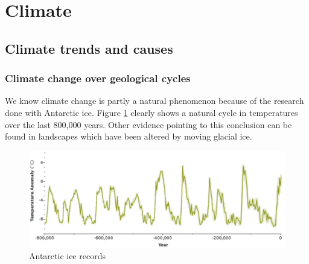 \documentclass[../summary.tex]{subfiles}
\begin{document}
	
	\section{Climate}
		
		\subsection{Climate trends and causes}
			\subsubsection{Climate change over geological cycles}
				We know climate change is partly a natural phenomenon because of the research done with Antarctic ice. Figure \ref{fig:1-antarctic-ice-records} clearly shows a natural cycle in temperatures over the last 800,000 years. Other evidence pointing to this conclusion can be found in landscapes which have been altered by moving glacial ice.
				\begin{figure}[h]
					\centering
					\includegraphics[width=0.7\linewidth]{../images/1-antarctic-ice-records.png}
					\caption{Antarctic ice records}
					\label{fig:1-antarctic-ice-records}
				\end{figure}
			
\end{document}
